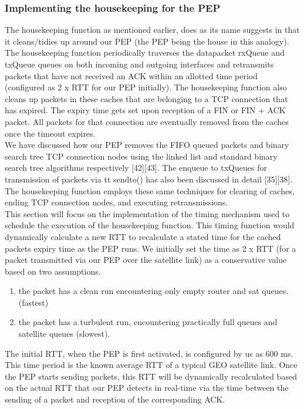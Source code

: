 \documentclass{uathesis}
\begin{document}
\subsubsection{Implementing the housekeeping for the PEP}
The housekeeping function as mentioned earlier, does as its name suggests in that it cleans/tidies up around our PEP (the PEP being the house in this analogy). The housekeeping function periodically traverses the datapacket rxQueue and txQueue queues on both incoming and outgoing interfaces and retransmits packets that have not received an ACK within an allotted time period (configured as 2 x RTT for our PEP initially). The housekeeping function also cleans up packets in these caches that are belonging to a TCP connection that has expired. The expiry time gets set upon reception of a FIN or FIN + ACK packet. All packets for that connection are eventually removed from the caches once the timeout expires.\\

We have discussed how our PEP removes the FIFO queued packets and binary search tree TCP connection nodes using the linked list and standard binary search tree algorithms respectively [42][43]. The enqueue to txQueues for transmission of packets via {tt sendto()} has also been discussed in detail [35][38]. The housekeeping function employs these same techniques for clearing of caches, ending TCP connection nodes, and executing retransmissions. \\

This section will focus on the implementation of the timing mechanism used to schedule the execution of the housekeeping function. This timing function would dynamically calculate a new RTT to recalculate a stated time for the cached packets expiry time as the PEP runs. We initially set the time as 2 x RTT (for a packet transmitted via our PEP over the satellite link) as a conservative value based on two assumptions. \\

\begin{enumerate}
\item the packet has a clean run encountering only empty router and sat queues. (fastest)
\item the packet has a turbulent run, encountering practically full queues and satellite queues (slowest). \\
\end{enumerate}

The initial RTT, when the PEP is first activated, is configured by us as 600 ms. This time period is the known average RTT of a typical GEO satellite link. Once the PEP starts sending packets, this RTT will be dynamically recalculated based on the actual RTT that our PEP detects in real-time via the time between the sending of a packet and reception of the corresponding ACK.\\
\end{document}
